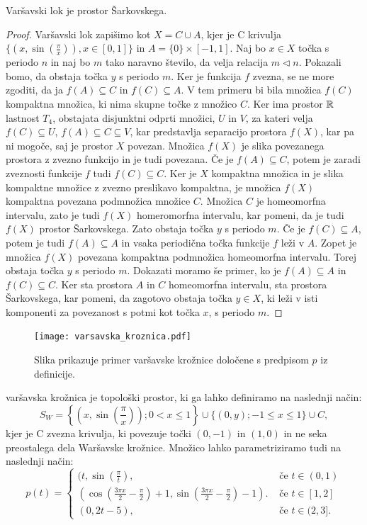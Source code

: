 \documentclass[../TG_magistrsko_delo_sections.tex]{subfiles}
\begin{document}
\begin{trditev}
Varšavski lok je prostor Šarkovskega.
\end{trditev}
\begin{proof}
Varšavski lok zapišimo kot $X = C \cup A$, kjer je C krivulja $\{(x, \sin(\frac{\pi}{x})), x\in [0, 1]\}$ in $A= \{0\} \times [-1, 1]$. Naj bo $x \in X$ točka s periodo $n$ in naj bo $m$ tako naravno število, da velja relacija $m \triangleleft n$. Pokazali bomo, da obstaja točka $y$ s periodo $m$. Ker je funkcija $f$ zvezna, se ne more zgoditi, da ja $f(A) \subseteq C$ in $f(C) \subseteq A$. V tem primeru bi bila množica $f(C)$ kompaktna množica, ki nima skupne točke z množico $C$. Ker ima prostor $\mathbb R$ lastnost $T_4$, obstajata disjunktni odprti množici, $U$ in $V$, za kateri velja $f(C) \subseteq U$, $f(A) \subseteq C \subseteq V$, kar predstavlja separacijo prostora $f(X)$, kar pa ni mogoče, saj je prostor $X$ povezan. Množica $f(X)$ je slika povezanega prostora z zvezno funkcijo in je tudi povezana. Če je $f(A) \subseteq C$, potem je zaradi zveznosti funkcije $f$ tudi $f(C) \subseteq C$. Ker je $X$ kompaktna množica in je slika kompaktne množice z zvezno preslikavo kompaktna, je množica $f(X)$ kompaktna povezana podmnožica množice $C$. Množica $C$ je homeomorfna intervalu, zato je tudi $f(X)$ homeromorfna intervalu, kar pomeni, da je tudi $f(X)$ prostor Šarkovskega. Zato obstaja točka $y$ s periodo $m$. Če je $f (C) \subseteq A $, potem je tudi $f (A) \subseteq A $ in vsaka periodična točka funkcije $f$ leži v $A$.  Zopet je množica $f(X)$ povezana kompaktna podmnožica homeomorfna intervalu. Torej obstaja točka $y$ s periodo $m$. 
Dokazati moramo še primer, ko je $f (A) \subseteq A $ in $f (C) \subseteq C $. Ker sta prostora $A$ in $C$ homeomorfna intervalu, sta prostora Šarkovskega, kar pomeni, da zagotovo obstaja točka $y \in X$, ki leži v isti komponenti za povezanost s potmi kot točka $x$, s periodo $m$.
\end{proof}


\begin{figure}[h]
  \centering
  \texttt{[image: varsavska\_kroznica.pdf]}
  \caption[Varšavska krožnica]{Slika prikazuje primer varšavske krožnice določene s predpisom $p$ iz definicije.}
  \label{fig:varšavski}
\end{figure}


\begin{definicija}\label{def:vk}
varšavska krožnica je topološki prostor, ki ga lahko definiramo na naslednji način:
$$S_W = \left\{\left(x, \sin\left(\frac{\pi}{x}\right)\right); 0 < x \leq 1\right\} \cup \{(0, y); -1 \leq x \leq 1\} \cup C,$$
kjer je C zvezna krivulja, ki povezuje točki $(0,-1)$ in $(1,0)$ in ne seka preostalega dela Waršavske krožnice.
Množico lahko parametriziramo tudi na naslednji način:
\[ p(t) = \begin{cases}
  (t, \sin(\frac{\pi}{t}), & \mbox{ če $t \in (0, 1) $}\\
 (\cos(\frac{3\pi x}{2}-\frac{\pi}{2})+1, \sin(\frac{3\pi x}{2}-\frac{\pi}{2})-1). & \mbox{ če $t \in [1, 2]$}\\
  (0, 2t-5), & \mbox{ če $t \in (2, 3]$.}
  \end{cases}
  \]
\end{definicija}
\end{document}
